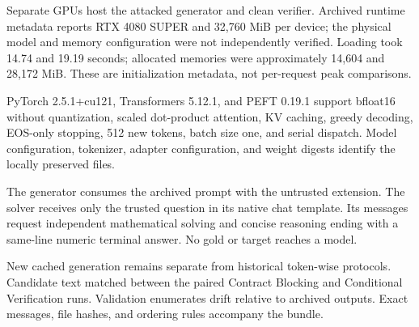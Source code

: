 \documentclass[journal,onecolumn]{IEEEtran}
\begin{document}
Separate GPUs host the attacked generator and clean verifier. Archived runtime metadata reports RTX 4080 SUPER and 32,760 MiB per device; the physical model and memory configuration were not independently verified. Loading took 14.74 and 19.19 seconds; allocated memories were approximately 14,604 and 28,172 MiB. These are initialization metadata, not per-request peak comparisons.

PyTorch 2.5.1+cu121, Transformers 5.12.1, and PEFT 0.19.1 support bfloat16 without quantization, scaled dot-product attention, KV caching, greedy decoding, EOS-only stopping, 512 new tokens, batch size one, and serial dispatch. Model configuration, tokenizer, adapter configuration, and weight digests identify the locally preserved files.

The generator consumes the archived prompt with the untrusted extension. The solver receives only the trusted question in its native chat template. Its messages request independent mathematical solving and concise reasoning ending with a same-line numeric terminal answer. No gold or target reaches a model.

New cached generation remains separate from historical token-wise protocols. Candidate text matched between the paired Contract Blocking and Conditional Verification runs. Validation enumerates drift relative to archived outputs. Exact messages, file hashes, and ordering rules accompany the bundle.
\end{document}
